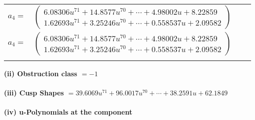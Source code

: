 \documentclass[1p]{elsarticle_modified}
\theoremstyle{definition}
\begin{document}
\begin{tabular}{m{7pt} m{180pt} m{7pt} m{180pt} }
\flushright $a_{4}=$&$\begin{pmatrix}6.08306 u^{71}+14.8577 u^{70}+\cdots+4.98002 u+8.22859\\1.62693 u^{71}+3.25246 u^{70}+\cdots+0.558537 u+2.09582\end{pmatrix}$\\ \flushright $a_{4}=$&$\begin{pmatrix}6.08306 u^{71}+14.8577 u^{70}+\cdots+4.98002 u+8.22859\\1.62693 u^{71}+3.25246 u^{70}+\cdots+0.558537 u+2.09582\end{pmatrix}$\\&\end{tabular}
\flushleft \textbf{(ii) Obstruction class $= -1$}\\~\\
\flushleft \textbf{(iii) Cusp Shapes $= 39.6069 u^{71}+96.0017 u^{70}+\cdots+38.2591 u+62.1849$}\\~\\
\newpage\renewcommand{\arraystretch}{1}
\flushleft \textbf{(iv) u-Polynomials at the component}\newline \\
\end{document}
